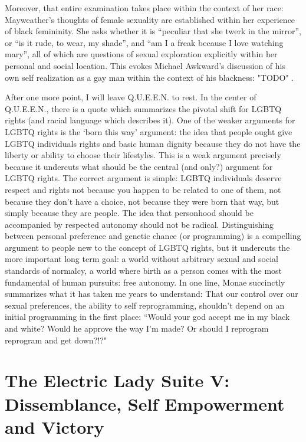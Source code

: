 \documentclass[a4paper, 11pt]{article} %
\begin{document}
Moreover, that entire examination takes place within the context of her race: Mayweather's thoughts of female sexuality are established within her experience of black femininity.
She asks whether it is ``peculiar that she twerk in the mirror'', or ``is it rude, to wear, my shade'', and ``am I a freak because I love watching mary'', all of which are questions of sexual exploration explicitly within her personal and social location.
This evokes Michael Awkward's discussion of his own self realization as a gay man within the context of his blackness: "TODO" \cite{awkward}.

After one more point, I will leave Q.U.E.E.N. to rest.
In the center of Q.U.E.E.N., there is a quote which summarizes the pivotal shift for LGBTQ rights (and racial language which describes it).
One of the weaker arguments for LGBTQ rights is the `born this way' argument: the idea that people ought give LGBTQ individuals rights and basic human dignity because they do not have the liberty or ability to choose their lifestyles.
This is a weak argument precisely because it undercuts what should be the central (and only?) argument for LGBTQ rights.
The correct argument is simple: LGBTQ individuals deserve respect and rights not because you happen to be related to one of them, not because they don't have a choice, not because they were born that way, but simply because they are people.
The idea that personhood should be accompanied by respected autonomy should not be radical.
Distinguishing between personal preference and genetic chance (or programming) is a compelling argument to people new to the concept of LGBTQ rights, but it undercuts the more important long term goal: a world without arbitrary sexual and social standards of normalcy, a world where birth as a person comes with the most fundamental of human pursuits: free autonomy. 
In one line, Monae succinctly summarizes what it has taken me years to understand: That our control over our sexual preferences, the ability to self reprogramming, shouldn't depend on an initial programming in the first place:
``Would your god accept me in my black and white? Would he approve the way I'm made? Or should I reprogram reprogram and get down?!?" \cite{queen}



\section*{The Electric Lady Suite V: Dissemblance, Self Empowerment and Victory}
\end{document}
